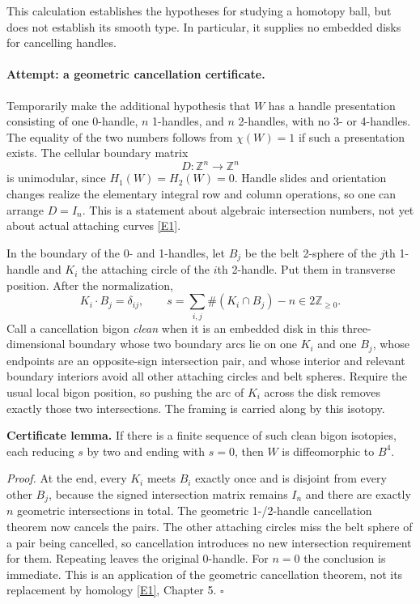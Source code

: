 \documentclass[11pt,a4paper]{article}
\newcommand{\Z}{\mathbb{Z}}
\newcommand{\eref}[2]{\hyperlink{extra:#1:#2}{[E#2]}}
\numberwithin{equation}{section}
\begin{document}
This calculation establishes the hypotheses for studying a homotopy
ball, but does not establish its smooth type. In particular, it supplies
no embedded disks for cancelling handles.

\paragraph{Attempt: a geometric cancellation certificate.}
Temporarily make the additional hypothesis that $W$ has a handle
presentation consisting of one 0-handle, $n$ 1-handles, and $n$ 2-handles,
with no 3- or 4-handles. The equality of the two numbers follows from
$\chi(W)=1$ if such a presentation exists. The cellular boundary matrix
\begin{equation}
 D:\Z^n\longrightarrow\Z^n
\end{equation}
is unimodular, since $H_1(W)=H_2(W)=0$. Handle slides and orientation
changes realize the elementary integral row and column operations, so
one can arrange $D=I_n$. This is a statement about algebraic intersection
numbers, not yet about actual attaching curves \eref{165}{1}.

In the boundary of the 0- and 1-handles, let $B_j$ be the belt 2-sphere
of the $j$th 1-handle and $K_i$ the attaching circle of the $i$th
2-handle. Put them in transverse position. After the normalization,
\begin{equation}
 K_i\mathbin{\cdot} B_j=\delta_{ij},\qquad
 s=\sum_{i,j}\#(K_i\cap B_j)-n\in 2\Z_{\geq0}.
\end{equation}
Call a cancellation bigon \emph{clean} when it is an embedded disk in
this three-dimensional boundary whose two boundary arcs lie on one
$K_i$ and one $B_j$, whose endpoints are an opposite-sign intersection
pair, and whose interior and relevant boundary interiors avoid all
other attaching circles and belt spheres. Require the usual local
bigon position, so pushing the arc of $K_i$ across the disk removes
exactly those two intersections. The framing is carried along by this
isotopy.

\textbf{Certificate lemma.} If there is a finite sequence of such clean
bigon isotopies, each reducing $s$ by two and ending with $s=0$, then
$W$ is diffeomorphic to $B^4$.

\emph{Proof.} At the end, every $K_i$ meets $B_i$ exactly once and is
disjoint from every other $B_j$, because the signed intersection matrix
remains $I_n$ and there are exactly $n$ geometric intersections in total.
The geometric 1-/2-handle cancellation theorem now cancels the pairs.
The other attaching circles miss the belt sphere of a pair being
cancelled, so cancellation introduces no new intersection requirement
for them. Repeating leaves the original 0-handle. For $n=0$ the
conclusion is immediate. This is an application of the geometric
cancellation theorem, not its replacement by homology
\eref{165}{1}, Chapter 5. \hfill$\square$
\end{document}
